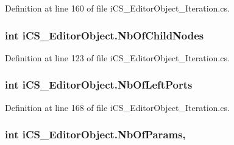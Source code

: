 Definition at line 160 of file i\+C\+S\+\_\+\+Editor\+Object\+\_\+\+Iteration.\+cs.

\hypertarget{classi_c_s___editor_object_aa5b466947de2dc029cc4b7dc777c99bc}{
\subsubsection[{Nb\+Of\+Child\+Nodes}]{\setlength{\rightskip}{0pt plus 5cm}int i\+C\+S\+\_\+\+Editor\+Object.\+Nb\+Of\+Child\+Nodes\hspace{0.3cm}{\ttfamily [get]}}}\label{classi_c_s___editor_object_aa5b466947de2dc029cc4b7dc777c99bc}


Definition at line 123 of file i\+C\+S\+\_\+\+Editor\+Object\+\_\+\+Iteration.\+cs.

\hypertarget{classi_c_s___editor_object_aeba2e35e439a541b9dc0c65bcc14dc82}{
\subsubsection[{Nb\+Of\+Left\+Ports}]{\setlength{\rightskip}{0pt plus 5cm}int i\+C\+S\+\_\+\+Editor\+Object.\+Nb\+Of\+Left\+Ports\hspace{0.3cm}{\ttfamily [get]}}}\label{classi_c_s___editor_object_aeba2e35e439a541b9dc0c65bcc14dc82}


Definition at line 168 of file i\+C\+S\+\_\+\+Editor\+Object\+\_\+\+Iteration.\+cs.

\hypertarget{classi_c_s___editor_object_a44e579e540626cd82bd78e74a9024971}{
\subsubsection[{Nb\+Of\+Params}]{\setlength{\rightskip}{0pt plus 5cm}int i\+C\+S\+\_\+\+Editor\+Object.\+Nb\+Of\+Params\hspace{0.3cm}{\ttfamily [get]}, {\ttfamily [set]}}}\label{classi_c_s___editor_object_a44e579e540626cd82bd78e74a9024971}


